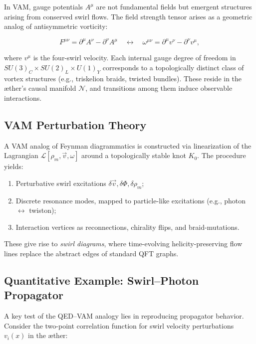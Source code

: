 \documentclass[12pt]{article}
\begin{document}
In VAM, gauge potentials \( A^\mu \) are not fundamental fields but emergent structures arising from conserved swirl flows. The field strength tensor arises as a geometric analog of antisymmetric vorticity:

\begin{equation}
F^{\mu\nu} = \partial^\mu A^\nu - \partial^\nu A^\mu
\quad \leftrightarrow \quad
\omega^{\mu\nu} = \partial^\mu v^\nu - \partial^\nu v^\mu,
\end{equation}

where \( v^\mu \) is the four-swirl velocity. Each internal gauge degree of freedom in \( SU(3)_C \times SU(2)_L \times U(1)_Y \) corresponds to a topologically distinct class of vortex structures (e.g., triskelion braids, twisted bundles). These reside in the æther's causal manifold \( \mathcal{N} \), and transitions among them induce observable interactions.

\subsection{VAM Perturbation Theory}

A VAM analog of Feynman diagrammatics is constructed via linearization of the Lagrangian \( \mathcal{L}[\rho_{\scriptscriptstyle\boldsymbol\!m}, \vec{v}, \omega] \) around a topologically stable knot \( K_0 \). The procedure yields:

\begin{enumerate}
    \item Perturbative swirl excitations \( \delta \vec{v}, \delta \Phi, \delta \rho_{\scriptscriptstyle\boldsymbol\!m} \);
    \item Discrete resonance modes, mapped to particle-like excitations (e.g., photon $\leftrightarrow$ twiston);
    \item Interaction vertices as reconnections, chirality flips, and braid-mutations.
\end{enumerate}

These give rise to \textit{swirl diagrams}, where time-evolving helicity-preserving flow lines replace the abstract edges of standard QFT graphs.

\subsection*{Quantitative Example: Swirl–Photon Propagator}

A key test of the QED–VAM analogy lies in reproducing propagator behavior. Consider the two-point correlation function for swirl velocity perturbations \( v_i(x) \) in the æther:
\end{document}
